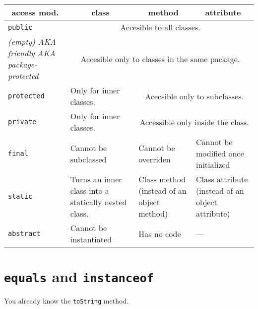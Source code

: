 \documentclass[a4paper, 9pt]{extarticle}
\begin{document}
\begin{center}
  \begin{tabular}{|p{3cm}|p{4cm}|p{4cm}|p{4cm}|}
\hline
\multicolumn{1}{|c|}{access mod.} & \multicolumn{1}{|c|}{class} & \multicolumn{1}{|c|}{method} & \multicolumn{1}{|c|}{attribute} \\
\hline
\texttt{public}    & \multicolumn{3}{|c|}{Accesible to all classes.} \\
\hline
\textsl{(empty) AKA friendly AKA package-protected} & \multicolumn{3}{|c|}{Accesible only to classes in the same package.} \\
\hline
\texttt{protected}   & Only for inner classes. & \multicolumn{2}{|c|}{Acecsible only to subclasses.} \\
\hline
\texttt{private}     & Only for inner classes. & \multicolumn{2}{|c|}{Accessible only inside the class.} \\
\hline
\hline
\texttt{final}       & Cannot be subclassed & Cannot be overriden & Cannot be modified once initialized \\
\hline
\texttt{static}      & Turns an inner class into a statically nested class. & Class method (instead of an object method) & Class attribute (instead of an object attribute) \\
\hline
\texttt{abstract}    & Cannot be instantiated & Has no code & --- \\
\hline
\end{tabular}
\end{center}



































\section{\texttt{equals} and \texttt{instanceof}}

You already know the \texttt{toString} method.
\end{document}
